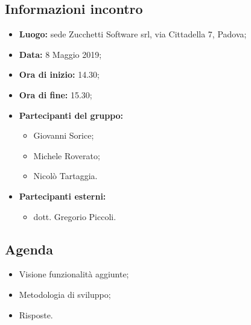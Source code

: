 \subsection{Informazioni incontro}
\begin{itemize}
	\item { \textbf{Luogo:} sede Zucchetti Software srl, via Cittadella 7, Padova;}
	\item { \textbf{Data:} 8 Maggio 2019};
	\item { \textbf{Ora di inizio:} 14.30};
	\item { \textbf{Ora di fine:} 15.30};
	\item { \textbf{Partecipanti del gruppo:}	\begin{itemize}
			\item Giovanni Sorice;
			\item Michele Roverato;
			\item Nicolò Tartaggia.
	\end{itemize}}
	\item { \textbf{Partecipanti esterni:} 
	\begin{itemize}
			\item dott. Gregorio Piccoli.
	\end{itemize}}
\end{itemize}


\subsection{Agenda}
\begin{itemize}
	\item {Visione funzionalità aggiunte;}
	\item {Metodologia di sviluppo;}
	\item {Risposte.}
\end{itemize}

